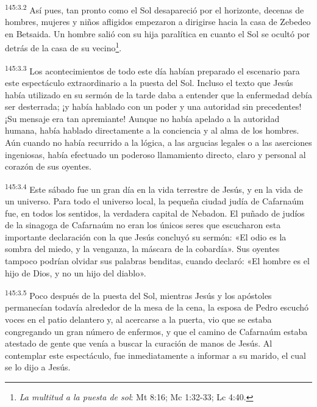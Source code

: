 \par
\textsuperscript{145:3.2} Así pues, tan pronto como el Sol desapareció por el horizonte, decenas de hombres, mujeres y niños afligidos empezaron a dirigirse hacia la casa de Zebedeo en Betsaida. Un hombre salió con su hija paralítica en cuanto el Sol se ocultó por detrás de la casa de su vecino\footnote{\textit{La multitud a la puesta de sol}: Mt 8:16; Mc 1:32-33; Lc 4:40.}.

\par
\textsuperscript{145:3.3} Los acontecimientos de todo este día habían preparado el escenario para este espectáculo extraordinario a la puesta del Sol. Incluso el texto que Jesús había utilizado en su sermón de la tarde daba a entender que la enfermedad debía ser desterrada; ¡y había hablado con un poder y una autoridad sin precedentes! ¡Su mensaje era tan apremiante! Aunque no había apelado a la autoridad humana, había hablado directamente a la conciencia y al alma de los hombres. Aún cuando no había recurrido a la lógica, a las argucias legales o a las aserciones ingeniosas, había efectuado un poderoso llamamiento directo, claro y personal al corazón de sus oyentes.

\par
\textsuperscript{145:3.4} Este sábado fue un gran día en la vida terrestre de Jesús, y en la vida de un universo. Para todo el universo local, la pequeña ciudad judía de Cafarnaúm fue, en todos los sentidos, la verdadera capital de Nebadon. El puñado de judíos de la sinagoga de Cafarnaúm no eran los únicos seres que escucharon esta importante declaración con la que Jesús concluyó su sermón: «El odio es la sombra del miedo, y la venganza, la máscara de la cobardía». Sus oyentes tampoco podrían olvidar sus palabras benditas, cuando declaró: «El hombre es el hijo de Dios, y no un hijo del diablo».

\par
\textsuperscript{145:3.5} Poco después de la puesta del Sol, mientras Jesús y los apóstoles permanecían todavía alrededor de la mesa de la cena, la esposa de Pedro escuchó voces en el patio delantero y, al acercarse a la puerta, vio que se estaba congregando un gran número de enfermos, y que el camino de Cafarnaúm estaba atestado de gente que venía a buscar la curación de manos de Jesús. Al contemplar este espectáculo, fue inmediatamente a informar a su marido, el cual se lo dijo a Jesús.

